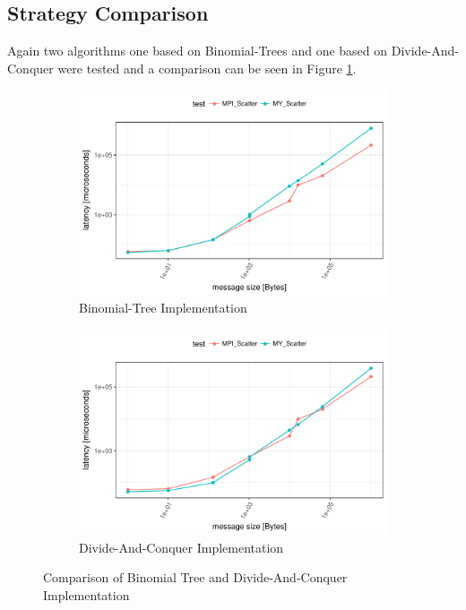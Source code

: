\subsection{Strategy Comparison}
Again two algorithms one based on Binomial-Trees and one based on Divide-And-Conquer were tested and a comparison can be seen in Figure \ref{fig:scatter:binom_vs_dac}.

\begin{figure}[h]
  \centering
  \begin{subfigure}[b]{0.49\textwidth}
        \includegraphics[width=\textwidth]{../benchmarks/openmpi/binom/scatter_32/runtime.pdf}
        \caption{Binomial-Tree Implementation}
    \end{subfigure}
    \begin{subfigure}[b]{0.49\textwidth}
        \includegraphics[width=\textwidth]{../benchmarks/openmpi/divide_conquer/scatter_32/runtime.pdf}
        \caption{Divide-And-Conquer Implementation}
    \end{subfigure}
    \caption{Comparison of Binomial Tree and Divide-And-Conquer Implementation}
    \label{fig:scatter:binom_vs_dac}
\end{figure}

